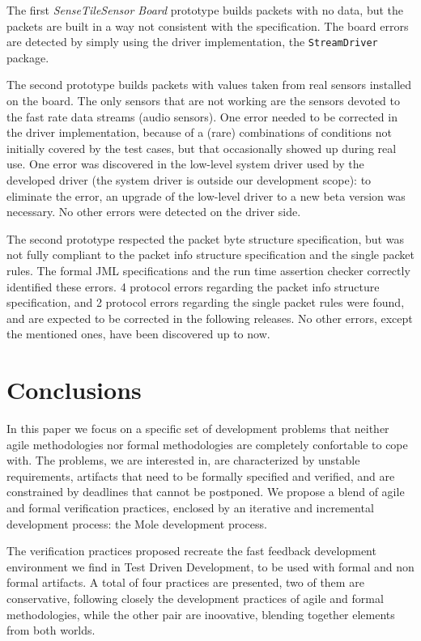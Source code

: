 \documentclass[english]{lni}
\newcommand{\lil}[1]{\texttt{\lstinline|#1|}}
\newcommand{\ST}{\emph{SenseTile}\xspace}
\newcommand{\SB}{\emph{Sensor Board}\xspace}
\newcommand{\STSB}{\ST \SB\xspace}
\begin{document}
The first \STSB prototype builds packets with no data, but the packets are built in a way not consistent with the specification.  
The board errors are detected by simply using the driver implementation, the \lil{StreamDriver} package.

The second prototype builds packets with values taken from real sensors installed on the board.  
The only sensors that are not working are the sensors devoted to the fast rate data streams (audio sensors).  
One error needed to be corrected in the driver implementation, because of a (rare) combinations of conditions not initially covered by the test cases, but that occasionally showed up during real use.
One error was discovered in the low-level system driver used by the developed driver (the system driver is outside our development scope): to eliminate the error, an upgrade of the low-level driver to a new beta version was necessary. 
No other errors were detected on the driver side.

The second prototype respected the packet byte structure specification, but was not fully compliant to the packet info structure specification and the single packet rules.
The formal JML specifications and the run time assertion checker correctly identified these errors.
4 protocol errors regarding the packet info structure specification, and 2 protocol errors regarding the single packet rules were found, and are expected to be corrected in the following releases. 
No other errors, except the mentioned ones, have been discovered up to now.



\section{Conclusions}
\label{sec:conclusions}

In this paper we focus on a specific set of development problems that neither agile methodologies nor formal methodologies are completely confortable to cope with.
The problems, we are interested in, are characterized by unstable requirements, artifacts that need to be formally specified and verified, and are constrained by deadlines that cannot be postponed.
We propose a blend of agile and formal verification practices, enclosed by an iterative and incremental development process: the Mole development process.

The verification practices proposed recreate the fast feedback development environment we find in Test Driven Development, to be used with formal and non formal artifacts.
A total of four practices are presented, two of them are conservative, following closely the development practices of agile and formal methodologies, while the other pair are inoovative, blending together elements from both worlds.
\end{document}
